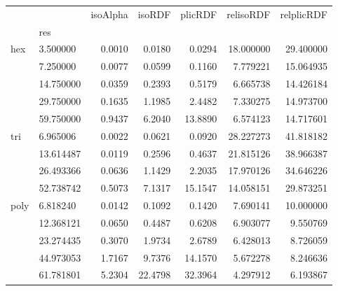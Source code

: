 \begin{tabular}{llrrrrr}
\toprule
    &           &  isoAlpha &   isoRDF &  plicRDF &  relisoRDF &  relplicRDF \\
{} & res &           &          &          &            &             \\
\midrule
hex & 3.500000  &    0.0010 &   0.0180 &   0.0294 &  18.000000 &   29.400000 \\
    & 7.250000  &    0.0077 &   0.0599 &   0.1160 &   7.779221 &   15.064935 \\
    & 14.750000 &    0.0359 &   0.2393 &   0.5179 &   6.665738 &   14.426184 \\
    & 29.750000 &    0.1635 &   1.1985 &   2.4482 &   7.330275 &   14.973700 \\
    & 59.750000 &    0.9437 &   6.2040 &  13.8890 &   6.574123 &   14.717601 \\
tri & 6.965006  &    0.0022 &   0.0621 &   0.0920 &  28.227273 &   41.818182 \\
    & 13.614487 &    0.0119 &   0.2596 &   0.4637 &  21.815126 &   38.966387 \\
    & 26.493366 &    0.0636 &   1.1429 &   2.2035 &  17.970126 &   34.646226 \\
    & 52.738742 &    0.5073 &   7.1317 &  15.1547 &  14.058151 &   29.873251 \\
poly & 6.818240  &    0.0142 &   0.1092 &   0.1420 &   7.690141 &   10.000000 \\
    & 12.368121 &    0.0650 &   0.4487 &   0.6208 &   6.903077 &    9.550769 \\
    & 23.274435 &    0.3070 &   1.9734 &   2.6789 &   6.428013 &    8.726059 \\
    & 44.973053 &    1.7167 &   9.7376 &  14.1570 &   5.672278 &    8.246636 \\
    & 61.781801 &    5.2304 &  22.4798 &  32.3964 &   4.297912 &    6.193867 \\
\bottomrule
\end{tabular}
